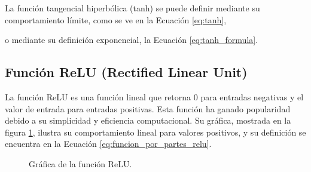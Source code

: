 La función tangencial hiperbólica (tanh) se puede definir mediante su comportamiento límite, como se ve en la Ecuación \ref{eq:tanh},


o mediante su definición exponencial, la Ecuación \ref{eq:tanh_formula}.


\subsection{Función ReLU (Rectified Linear Unit)}
La función ReLU es una función lineal que retorna 0 para entradas negativas y el valor de entrada para entradas positivas. Esta función ha ganado popularidad debido a su simplicidad y eficiencia computacional. Su gráfica, mostrada en la figura \ref{fig:relu}, ilustra su comportamiento lineal para valores positivos, y su definición se encuentra en la Ecuación \ref{eq:funcion_por_partes_relu}.

\begin{figure}[H]
    \centering
    \caption{Gráfica de la función ReLU.}
    \label{fig:relu} %
\end{figure}

